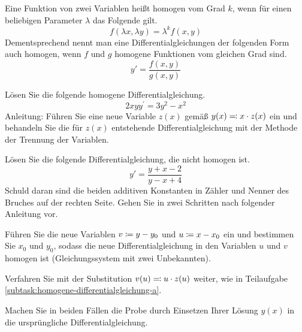 \begin{atiTask}[
	title = Homogene Differentialgleichungen
]
	Eine Funktion von zwei Variablen heißt homogen vom Grad $k$, wenn für einen beliebigen Parameter $\lambda$ das Folgende gilt.
	\[
		f(\lambda x, \lambda y) = \lambda^k f(x,y)
	\]
	Dementsprechend nennt man eine Differentialgleichungen der folgenden Form auch homogen, wenn $f$ und $g$ homogene Funktionen vom gleichen Grad sind.
	\[
		y' = \frac{f(x,y)}{g(x,y)}
	\]

	\begin{atiSubtasks}
		\item{
		\label{subtask:homogene-differentialgleichung-a}
			Lösen Sie die folgende homogene Differentialgleichung.
			\[
				2xyy^\prime = 3y^2 - x^2
			\]
			Anleitung: Führen Sie eine neue Variable $z(x)$ gemäß $y(x)\eqqcolon x\cdot z(x)$ ein und behandeln Sie die für $z(x)$ entstehende Differentialgleichung mit der Methode der Trennung der Variablen.
		}
		\item{
			Lösen Sie die folgende Differentialgleichung, die nicht homogen ist.
			\[
				y' = \frac{y+x-2}{y-x+4}
			\]
			Schuld daran sind die beiden additiven Konstanten in Zähler und Nenner des Bruches auf der rechten Seite.
			Gehen Sie in zwei Schritten nach folgender Anleitung vor.
			\begin{atiItems}
				\item Führen Sie die neue Variablen $v\coloneqq y-y_0$ und $u\coloneqq x-x_0$ ein und bestimmen Sie $x_0$ und $y_0$, sodass die neue Differentialgleichung in den Variablen $u$ und $v$ homogen ist (Gleichungssystem mit zwei Unbekannten).

				\item Verfahren Sie mit der Substitution $v(u)\eqqcolon u\cdot z(u)$ weiter, wie in Teilaufgabe \ref{subtask:homogene-differentialgleichung-a}.
			\end{atiItems}
		}
		\item{
			Machen Sie in beiden Fällen die Probe durch Einsetzen Ihrer Lösung $y(x)$ in die ursprüngliche Differentialgleichung.
		}
	\end{atiSubtasks}
\end{atiTask}